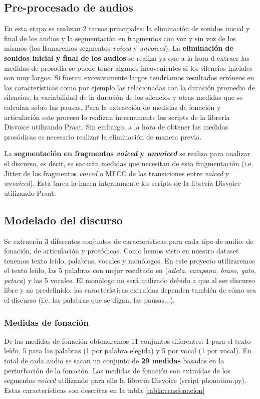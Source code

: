 
\subsection{Pre-procesado de audios}
En esta etapa se realizan 2 tareas principales: la eliminación de sonidos inicial y final de los audios y la segmentación en fragmentos con voz y sin voz de los mismos (los llamaremos segmentos \textit{voiced} y \textit{unvoiced}).
La \textbf{eliminación de sonidos inicial y final de los audios} se realiza ya que a la hora d extraer las medidas de prosodia se puede tener algunos incovenientes si los silencios iniciales son muy largos. Si fueran excesivamente largos tendríamos resultados erróneos en las características como por ejemplo las relacionadas con la duración promedio de silencios, la variabilidad de la duración de los silencios y otras medidas que se calculan sobre las pausas.
Para la extracción de medidas de fonación y articulación este proceso lo realizan internamente los scripts de la librería Disvoice \cite{neurospeech} utilizando Praat. Sin embargo, a la hora de obtener las medidas prosódicas es necesario realizar la eliminación de manera previa.

La \textbf{segmentación en fragmentos \textit{voiced} y \textit{unvoiced}} se realiza para analizar el discurso, es decir, se sacarán medidas que necesitan de esta fragmentación (i.e. Jitter de los fragmentos \textit{voiced} o MFCC de las transiciones entre \textit{voiced} y \textit{unvoiced}). Esta tarea la hacen internamente los scripts de la librería Disvoice utilizando Praat.

\subsection{Modelado del discurso} \label{subs:modeldisc}
Se extraerán 3 diferentes conjuntos de características para cada tipo de audio: de fonación, de articulación y prosódicas. Como hemos visto en nuestro dataset tenemos texto leído, palabras, vocales y monólogos. En este proyecto utilizaremos el texto leído, las 5 palabras con mejor resultado en \cite{Orz2016} (\textit{atleta, campana, braso, gato, petaca}) y las 5 vocales. El monólogo no será utilizado debido a que al ser discurso libre y no predefinido, las características extraídas dependen también de cómo sea el discurso (i.e. las palabras que se digan, las pausas...).

\subsubsection{Medidas de fonación}
De las medidas de fonación obtendremos 11 conjuntos diferentes: 1 para el texto leído, 5 para las palabras (1 por palabra elegida) y 5 por vocal (1 por vocal). En total de cada audio se sacan un conjunto de\textbf{ 29 medidas} basadas en la perturbación de la fonación. Las medidas de fonación son extraídas de los segmentos \textit{voiced} utilizando para ello la librería Disvoice (script phonation.py). Estas características son descritas en la tabla \ref{tabla:ccasfonacion}


